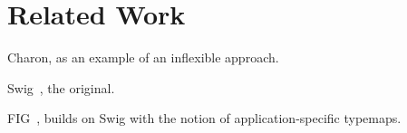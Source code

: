 
\section{Related Work}

Charon, as an example of an inflexible approach.

Swig~\cite{swig}, the original.

FIG~\cite{fig}, builds on Swig with the notion of application-specific typemaps.
